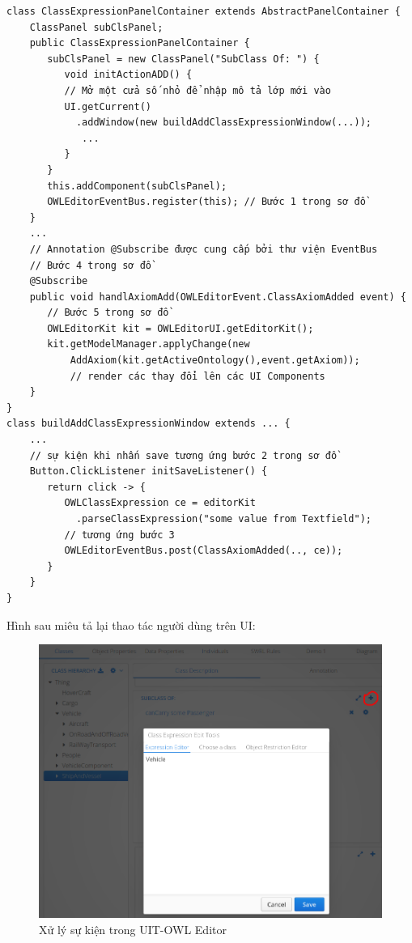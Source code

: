 \begin{verbatim}
class ClassExpressionPanelContainer extends AbstractPanelContainer {
    ClassPanel subClsPanel; 
    public ClassExpressionPanelContainer {
       subClsPanel = new ClassPanel("SubClass Of: ") {
          void initActionADD() { 
          // Mở một cửa số nhỏ để nhập mô tả lớp mới vào
          UI.getCurrent()
            .addWindow(new buildAddClassExpressionWindow(...));            
             ...
          }
       }
       this.addComponent(subClsPanel); 
	   OWLEditorEventBus.register(this); // Bước 1 trong sơ đồ
    }
    ...
    // Annotation @Subscribe được cung cấp bởi thư viện EventBus
    // Bước 4 trong sơ đồ 
    @Subscribe 
    public void handlAxiomAdd(OWLEditorEvent.ClassAxiomAdded event) {
       // Bước 5 trong sơ đồ
       OWLEditorKit kit = OWLEditorUI.getEditorKit();
       kit.getModelManager.applyChange(new 
           AddAxiom(kit.getActiveOntology(),event.getAxiom));
	       // render các thay đổi lên các UI Components
    }  
}
class buildAddClassExpressionWindow extends ... {
    ...
    // sự kiện khi nhấn save tương ứng bước 2 trong sơ đồ
    Button.ClickListener initSaveListener() {
       return click -> {
          OWLClassExpression ce = editorKit
            .parseClassExpression("some value from Textfield");
          // tương ứng bước 3 
          OWLEditorEventBus.post(ClassAxiomAdded(.., ce));
       }
    }
}
\end{verbatim}
Hình sau miêu tả lại thao tác người dùng trên UI:
\begin{figure}[h!]
	\centering
	\includegraphics[width=145mm]{Figures/eventBusExplain.png}
	\caption{Xử lý sự kiện trong UIT-OWL Editor\label{overflow}}
\end{figure}
